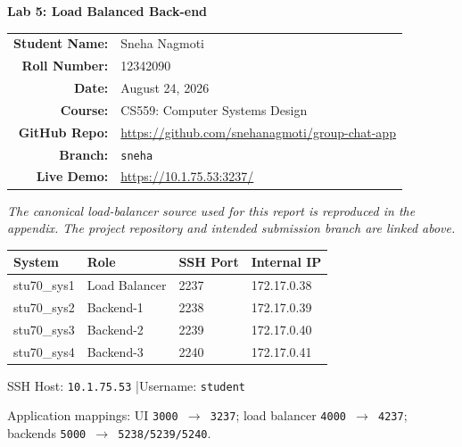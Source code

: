 \documentclass[12pt,a4paper]{article}
\begin{document}
\begin{titlepage}
\centering
\vspace*{2cm}

{\LARGE\bfseries Lab 5: Load Balanced Back-end\par}
\vspace{0.5cm}
\vspace{2cm}

\begin{tabular}{rl}
    \textbf{Student Name:} & Sneha Nagmoti \\[6pt]
    \textbf{Roll Number:}  & 12342090 \\[6pt]
    \textbf{Date:}         & August 24, 2026 \\[6pt]
    \textbf{Course:}       & CS559: Computer Systems Design \\[6pt]
    \textbf{GitHub Repo:}  & \url{https://github.com/snehanagmoti/group-chat-app} \\[6pt]
    \textbf{Branch:}       & \texttt{sneha} \\[6pt]
    \textbf{Live Demo:}    & \url{https://10.1.75.53:3237/} \\
\end{tabular}

\vspace{1cm}
\textit{The canonical load-balancer source used for this report is reproduced in the appendix. The project repository and intended submission branch are linked above.}

\vspace{1cm}

\begin{tabular}{|l|l|l|l|}
\hline
\textbf{System} & \textbf{Role} & \textbf{SSH Port} & \textbf{Internal IP} \\
\hline
stu70\_sys1 & Load Balancer   & 2237 & 172.17.0.38 \\
stu70\_sys2 & Backend-1       & 2238 & 172.17.0.39 \\
stu70\_sys3 & Backend-2       & 2239 & 172.17.0.40 \\
stu70\_sys4 & Backend-3       & 2240 & 172.17.0.41 \\
\hline
\end{tabular}

\vspace{0.5cm}
{\small SSH Host: \texttt{10.1.75.53} \quad|\quad Username: \texttt{student}}

\vspace{0.35cm}
{\small Application mappings: UI \texttt{3000 $\to$ 3237}; load balancer \texttt{4000 $\to$ 4237}; backends \texttt{5000 $\to$ 5238/5239/5240}.}

\vfill
\end{titlepage}
\end{document}
